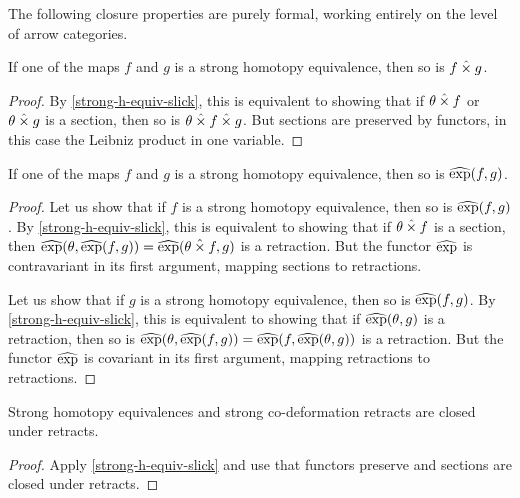 \documentclass[reqno,10pt,a4paper,oneside]{amsart}
\begin{document}
The following closure properties are purely formal, working entirely on the level of arrow categories.

\begin{proposition}
\label{strong-h-equiv-closed-under-prod}
If one of the maps $f$ and $g$ is a strong homotopy equivalence, then so is $f \mathbin{\hat{\times}} g$.
\end{proposition}

\begin{proof}
By \cref{strong-h-equiv-slick}, this is equivalent to showing that if $\theta \mathbin{\hat{\times}} f$ or $\theta \mathbin{\hat{\times}} g$ is a section, then so is $\theta \mathbin{\hat{\times}} f \mathbin{\hat{\times}} g$.
But sections are preserved by functors, in this case the Leibniz product in one variable.
\end{proof}

\begin{proposition}
\label{strong-h-equiv-closed-under-exp}
If one of the maps $f$ and $g$ is a strong homotopy equivalence, then so is $\operatorname{\widehat{exp}}(f, g)$.
\end{proposition}

\begin{proof}
Let us show that if $f$ is a strong homotopy equivalence, then so is $\operatorname{\widehat{exp}}(f, g)$.
By \cref{strong-h-equiv-slick}, this is equivalent to showing that if $\theta \mathbin{\hat{\times}} f$ is a section, then $\operatorname{\widehat{exp}}(\theta, \operatorname{\widehat{exp}}(f, g)) = \operatorname{\widehat{exp}}(\theta \mathbin{\hat{\times}} f, g)$ is a retraction.
But the functor $\operatorname{\widehat{exp}}$ is contravariant in its first argument, mapping sections to retractions.

Let us show that if $g$ is a strong homotopy equivalence, then so is $\operatorname{\widehat{exp}}(f, g)$.
By \cref{strong-h-equiv-slick}, this is equivalent to showing that if $\operatorname{\widehat{exp}}(\theta, g)$ is a retraction, then so is $\operatorname{\widehat{exp}}(\theta, \operatorname{\widehat{exp}}(f, g)) = \operatorname{\widehat{exp}}(f, \operatorname{\widehat{exp}}(\theta, g))$ is a retraction.
But the functor $\operatorname{\widehat{exp}}$ is covariant in its first argument, mapping retractions to retractions.
\end{proof}

\begin{proposition}
\label{strong-h-equiv-closed-under-retract}
Strong homotopy equivalences and strong co-deformation retracts are closed under retracts.
\end{proposition}

\begin{proof}
Apply \cref{strong-h-equiv-slick} and use that functors preserve and sections are closed under retracts.
\end{proof}
\end{document}
